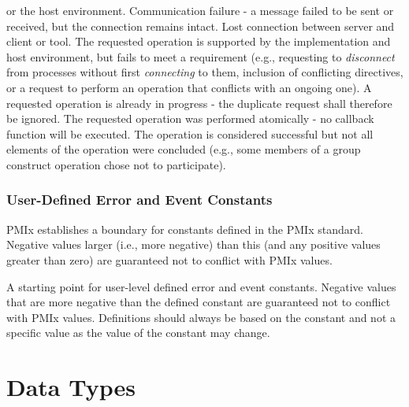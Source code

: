 \begin{constantdesc}
or the host environment.
%
Communication failure - a message failed to be sent or received, but the
connection remains intact.
%
Lost connection between server and client or tool.
%
The requested operation is supported by the implementation and host environment, but fails to meet a requirement (e.g., requesting to \textit{disconnect} from processes without first \textit{connecting} to them, inclusion of conflicting directives, or a request to perform an operation that conflicts with an ongoing one).
%
A requested operation is already in progress - the duplicate request
shall therefore be ignored.
%
The requested operation was performed atomically - no callback function will be executed.
%
The operation is considered successful but not all elements of the operation were concluded (e.g., some members of a group construct operation chose not to participate).
%
\end{constantdesc}


\subsubsection{User-Defined Error and Event Constants}
\label{api:struct:usererrors}

\ac{PMIx} establishes a boundary for constants defined in the \ac{PMIx} standard. Negative values larger (i.e., more negative) than this (and any positive values greater than zero) are guaranteed not to conflict with \ac{PMIx} values.

\begin{constantdesc}
%
A starting point for user-level defined error and event constants.
Negative values that are more negative than the defined constant are guaranteed not to conflict with \ac{PMIx} values.
Definitions should always be based on the  constant and not a specific value as the value of the constant may change.
%
\end{constantdesc}



\section{Data Types}

